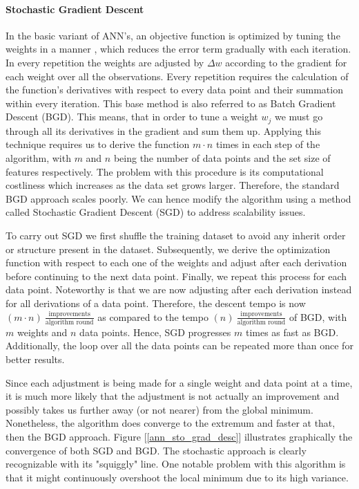 	\paragraph{Stochastic Gradient Descent}
		In the basic variant of ANN's, an objective function is optimized by tuning the weights in a manner , which reduces the error term gradually with each iteration. In every repetition the weights are adjusted by $ \Delta w $ according to the gradient for each weight over all the observations. Every repetition  requires the calculation of the function's derivatives with respect to every data point and their summation within every iteration. This base method is also referred to as Batch Gradient Descent (BGD). This means, that in order to tune a weight $ w_j $ we must go through all its derivatives in the gradient and sum them up.  Applying this technique requires us to derive the function $ m \cdot n $ times in each step of the algorithm, with $ m $ and $ n $ being the number of data points and the set size of features respectively. The problem with this procedure is its computational costliness which increases as the data set grows larger. Therefore, the standard BGD approach scales poorly. We can hence modify the algorithm using a method called Stochastic Gradient Descent (SGD) to address scalability issues.
		
		\par
	
		To carry out SGD we first shuffle the training dataset to avoid any inherit order or structure present in the dataset. Subsequently, we derive the optimization function with respect to each one of the weights and adjust after each derivation before continuing to the next data point. Finally, we repeat this process for each data point. Noteworthy is that we are now adjusting after each derivation instead for all derivations of a data point. Therefore, the descent tempo is now $ (m \cdot n) \ \frac{\text{improvements}}{\text{algorithm round}}$ as compared to the tempo $(n) \ \frac{\text{improvements}}{\text{algorithm round}}$ of BGD, with $ m $ weights and $ n $ data points. Hence, SGD progresses $ m $ times as fast as BGD. Additionally, the loop over all the data points can be repeated more than once for better results.
		
		\par
		
		Since each adjustment is being made for a single weight and data point at a time, it is much more likely that the adjustment is not actually an improvement and possibly takes us further away (or not nearer) from the global minimum. Nonetheless, the algorithm does converge to the extremum and faster at that, then the BGD approach.  Figure [\ref{ann_sto_grad_desc}] illustrates graphically the convergence of both SGD and BGD. The stochastic approach is clearly recognizable with its "squiggly" line. One notable problem with this algorithm is that it might continuously overshoot the local minimum due to its high variance.
		
